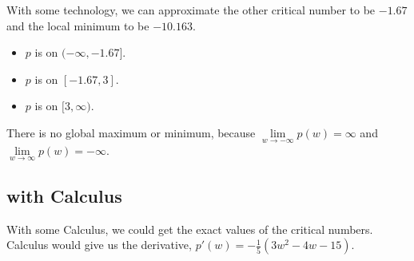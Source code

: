 \documentclass{ximera}
\begin{document}
\begin{example}
\begin{explanation}
\begin{image}
\end{image}

With some technology, we can approximate the other critical number to be $-1.67$ and the local minimum to be $-10.163$.


\begin{itemize}
\item $p$ is   on $(-\infty, -1.67]$.
\item $p$ is   on $[-1.67, 3]$.
\item $p$ is   on $[3, \infty)$.
\end{itemize}



There is no global maximum or minimum, because  $\lim\limits_{w \to -\infty}p(w) = \infty$ and $\lim\limits_{w \to \infty}p(w) = -\infty$. 


\end{explanation}

\end{example}


\subsection{with Calculus}


With some Calculus, we could get the exact values of the critical numbers. \\



Calculus would give us the derivative, $p'(w) = -\frac{1}{5}(3w^2 - 4w - 15)$. \\
\end{document}
